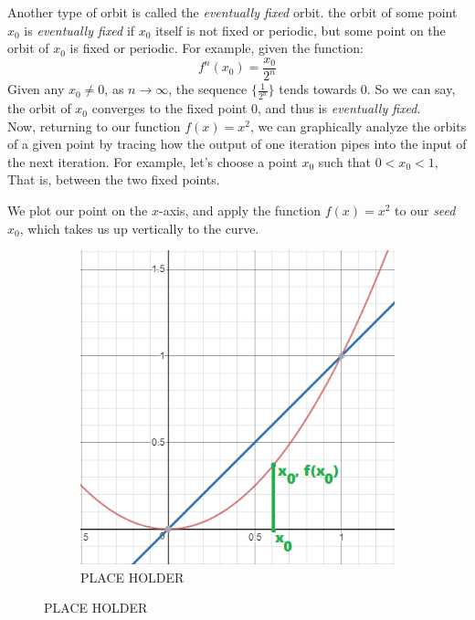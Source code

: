 \documentclass[20pt]{article} %
\begin{document}
Another type of orbit is called the \textit{eventually fixed} orbit.  the orbit of some point $x_0$ is \textit{eventually fixed} if $x_0$ itself is not fixed or periodic, but some point on the orbit of $x_0$ is fixed or periodic.  For example, given the function: 
$$f^{n}(x_0)=\frac{x_0}{2^{n}}$$
Given any $x_0 \neq 0$, as $n \rightarrow \infty$, the sequence $\{ \frac{1}{2^{n}} \}$ tends towards 0.  So we can say, the orbit of $x_0$ converges to the fixed point 0, and thus is \textit{eventually fixed}. \\ 

Now, returning to our function $f(x)=x^{2}$, we can graphically analyze the orbits of a given point by tracing how the output of one iteration pipes into the input of the next iteration.  For example, let's choose a point $x_0$ such that $0 < x_0 < 1$, That is, between the two fixed points.  

\newpage
We plot our point on the $x$-axis, and apply the function $f(x)=x^{2}$ to our \textit{seed} $x_0$, which takes us up vertically to the curve.
\begin{figure}[!htbp]
  	\centering
   	\begin{subfigure}[p]{0.5\linewidth}
    	\includegraphics[width=\linewidth]{./figures/fp-2.png}
	\caption{PLACE HOLDER}
   	\end{subfigure}
\end{figure} 
\end{document}
